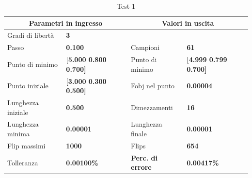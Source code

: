 \documentclass[a4paper, 11pt]{article}
\begin{document}
    \begin{table}[h]
        \caption{Test 1}
        \begin{center}
        \begin{tabular}{|l|l|l|l|} 
        \hline 
        \multicolumn{2}{|c|}{\textbf{Parametri in ingresso}} & \multicolumn{2}{c|}{\textbf{Valori in uscita}} \\ \hline
        Gradi di libertà  & \textbf{3} &  &  \\ \hline 
        Passo & \textbf{0.100} & Campioni & \textbf{61} \\ \hline 
        Punto di minimo & \textbf{{[}5.000 0.800 0.700{]}} & Punto di minimo & \textbf{{[}4.999 0.799 0.700{]}} \\ \hline 
        Punto iniziale & \textbf{{[}3.000 0.300 0.500{]}} & Fobj nel punto & \textbf{0.00004} \\ \hline 
        Lunghezza iniziale & \textbf{0.500} & Dimezzamenti & \textbf{16} \\ \hline 
        Lunghezza minima & \textbf{0.00001} & Lunghezza finale & \textbf{0.00001} \\ \hline
        Flip massimi & \textbf{1000} & Flips & \textbf{654} \\ \hline 
        Tolleranza & \textbf{0.00100\%} & \textbf{Perc. di errore} & \textbf{0.00417\%} \\ \hline 
        \end{tabular}
        \end{center}
        \end{table}


\noindent


\noindent
\end{document}
